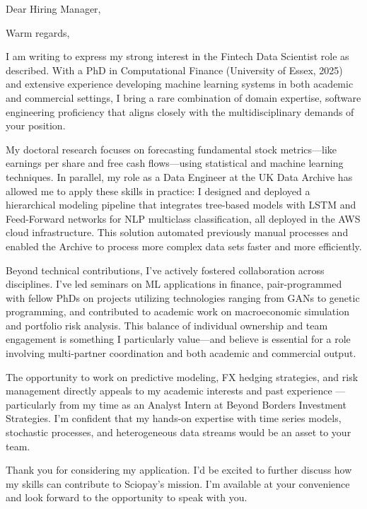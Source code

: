 \documentclass[11pt,a4paper,sans]{moderncv}
\newcommand{\positionname}{Fintech Data Scientist }
\begin{document}
\date{\today}
\opening{Dear Hiring Manager,}
\closing{Warm regards,}

\makelettertitle

I am writing to express my strong interest in the \positionname role as described. With a PhD in Computational Finance (University of Essex, 2025) and extensive experience developing machine learning systems in both academic and commercial settings, I bring a rare combination of domain expertise, software engineering proficiency that aligns closely with the multidisciplinary demands of your position.

My doctoral research focuses on forecasting fundamental stock metrics—like earnings per share and free cash flows—using statistical and machine learning techniques. In parallel, my role as a Data Engineer at the UK Data Archive has allowed me to apply these skills in practice: I designed and deployed a hierarchical modeling pipeline that integrates tree-based models with LSTM and Feed-Forward networks for NLP multiclass classification, all deployed in the AWS cloud infrastructure. 
This solution automated previously manual processes and enabled the Archive to process more complex data sets faster and more efficiently.

Beyond technical contributions, I’ve actively fostered collaboration across disciplines. I’ve led seminars on ML applications in finance, pair-programmed with fellow PhDs on projects utilizing technologies ranging from GANs to genetic programming, and contributed to academic work on macroeconomic simulation and portfolio risk analysis.
This balance of individual ownership and team engagement is something I particularly value—and believe is essential for a role involving multi-partner coordination and both academic and commercial output.

The opportunity to work on predictive modeling, FX hedging strategies, and risk management directly appeals to my academic interests and past experience --- particularly from my time as an Analyst Intern at Beyond Borders Investment Strategies. I’m confident that my hands-on expertise with time series models, stochastic processes, and heterogeneous data streams would be an asset to your team.

Thank you for considering my application. 
I’d be excited to further discuss how my skills can contribute to Sciopay’s mission. I’m available at your convenience and look forward to the opportunity to speak with you.

\makeletterclosing
\end{document}
